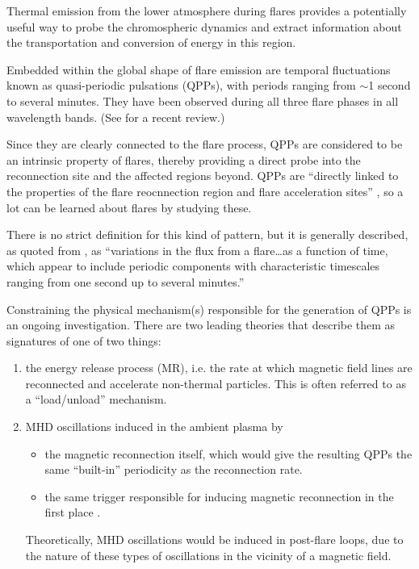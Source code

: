 
Thermal emission from the lower atmosphere during flares
provides a potentially useful
way to probe the chromospheric dynamics and extract
information about the transportation and conversion of energy in this
region.


Embedded within the global shape of flare emission
are temporal fluctuations known as quasi-periodic pulsations (QPPs),
with periods ranging from $\sim$1 second to several minutes.
They have been observed during all three flare phases
in all wavelength bands.
(See \cite{VanDoorsselaere2016} for a recent review.)


Since they are clearly connected to the flare process,
QPPs are considered to be an intrinsic
property of flares, thereby providing a direct probe into the
reconnection site and the affected regions beyond.
QPPs are ``directly linked to the properties of the flare reocnnection
region and flare acceleration sites'' \citep{Inglis2015},
so a lot can be learned about flares by studying these.


There is no strict definition for this kind of pattern, but it is generally
described, as quoted from \cite{Inglis2015}, as
``variations in the flux from a flare\ldots as a function of time,
which appear to include periodic components with characteristic timescales
ranging from one second up to several minutes.''


Constraining the physical mechanism(s) responsible for the
generation of QPPs is an ongoing investigation.
There are two leading theories that describe them as signatures of one of two
things:
\begin{enumerate}
    \item the energy release process (MR),
        i.e. the rate at which magnetic field lines are reconnected
        and accelerate non-thermal particles.
        This is often referred to as a ``load/unload'' mechanism.
    \item MHD oscillations induced in the ambient plasma by
        \begin{itemize}
            \item the magnetic reconnection itself, which would give the resulting
                QPPs the same ``built-in'' periodicity as the reconnection rate.
            \item the same trigger responsible for inducing magnetic reconnection
                in the first place \citep{Nakariakov2009}.
        \end{itemize}
        Theoretically, MHD oscillations would be induced in post-flare loops,
        due to the nature of these types of oscillations in the vicinity of a
        magnetic field.
\end{enumerate}

